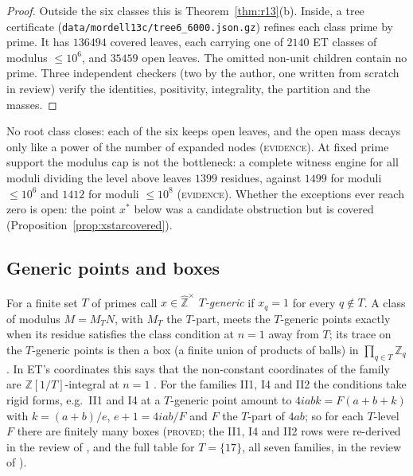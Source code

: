 \documentclass[11pt,reqno]{amsart}
\theoremstyle{definition}
\newcommand{\Z}{\mathbb Z}
\newcommand{\Zhu}{\widehat{\Z}^{\times}}
\newcommand{\status}[1]{\textup{\textsc{#1}}}
\begin{document}
\begin{proof}
Outside the six classes this is Theorem~\ref{thm:r13}(b).  Inside, a tree
certificate (\texttt{data/mordell13c/tree6\_6000.json.gz}) refines each
class prime by prime.  It has $136494$ covered leaves, each carrying one
of $2140$ ET classes of modulus $\le10^6$, and $35459$ open leaves.  The
omitted non-unit children contain no prime.  Three independent
checkers (two by the author, one written from scratch in review) verify
the identities, positivity, integrality, the partition and the masses.
\end{proof}

No root class closes: each of the six keeps open leaves, and the open
mass decays only like a power of the number of expanded nodes
(\status{evidence}).  At fixed prime
support the modulus cap is not the bottleneck: a complete witness engine
for all moduli dividing the level above leaves $1399$ residues, against
$1499$ for moduli $\le10^6$ and $1412$ for moduli $\le10^8$
\cite[\S2]{PM13C} (\status{evidence}).  Whether the exceptions ever reach zero is open: the
point $x^*$ below was a candidate obstruction but is covered
(Proposition~\ref{prop:xstarcovered}).

\subsection{Generic points and boxes}
For a finite set $T$ of primes call $x\in\Zhu$ \emph{$T$-generic} if
$x_q=1$ for every $q\notin T$.  A class of modulus $M=M_TN$, with $M_T$
the $T$-part, meets the $T$-generic points exactly when its residue
satisfies the class condition at $n=1$ away from $T$; its trace on the
$T$-generic points is then a box (a finite union of products of balls)
in $\prod_{q\in T}\Z_q$.  In ET's coordinates this says that the
non-constant coordinates of the family are $\Z[1/T]$-integral at $n=1$
\cite[\S2.1]{PM}.  For the families II1, I4 and II2 the conditions take
rigid forms, e.g.\ II1 and I4 at a $T$-generic point amount to
$4iabk=F(a+b+k)$ with $k=(a+b)/e$, $e+1=4iab/F$ and $F$ the $T$-part of
$4ab$; so for each $T$-level $F$ there are finitely many boxes
(\status{proved}; the II1, I4 and II2 rows were re-derived in the review
of \cite{PM}, and the full table for $T=\{17\}$, all seven families, in
the review of \cite{PM17}).
\end{document}
